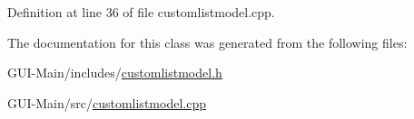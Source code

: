 Definition at line 36 of file customlistmodel.\+cpp.



The documentation for this class was generated from the following files\+:\begin{DoxyCompactItemize}
\item 
G\+U\+I-\/\+Main/includes/\hyperlink{customlistmodel_8h}{customlistmodel.\+h}\item 
G\+U\+I-\/\+Main/src/\hyperlink{customlistmodel_8cpp}{customlistmodel.\+cpp}\end{DoxyCompactItemize}
